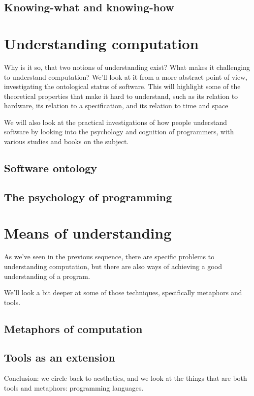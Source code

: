 \subsection{Knowing-what and knowing-how}


\section{Understanding computation}

Why is it so, that two notions of understanding exist? What makes it challenging to understand computation? We'll look at it from a more abstract point of view, investigating the ontological status of software. This will highlight some of the theoretical properties that make it hard to understand, such as its relation to hardware, its relation to a specification, and its relation to time and space

We will also look at the practical investigations of how people understand software by looking into the psychology and cognition of programmers, with various studies and books on the subject.

\subsection{Software ontology}

\subsection{The psychology of programming}

\section{Means of understanding}

As we've seen in the previous sequence, there are specific problems to understanding computation, but there are also ways of achieving a good understanding of a program.

We'll look a bit deeper at some of those techniques, specifically metaphors and tools.

\subsection{Metaphors of computation}

\subsection{Tools as an extension}


\pagebreak

Conclusion: we circle back to aesthetics, and we look at the things that are both tools and metaphors: programming languages.